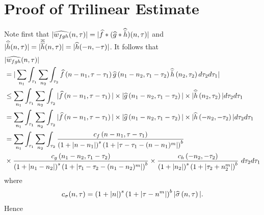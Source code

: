\section{Proof of Trilinear Estimate}
%
%
%
%
%
%
Note first that $|\widehat{w_{fgh}}(n, \tau) |  = | \widehat{f} * ( \widehat{g} 
* \widehat{\bar h})(n, \tau)|$ and $| \widehat{\bar{h}}(n, \tau) | = |\overline{ \widehat{\overline{h}} 
}(n, \tau)| = | \widehat{h}(-n, -\tau) |$. It follows that
%
%
\begin{equation}
	\label{nnon-lin-rep}
	\begin{split}
		& | \widehat{w_{fgh}}(n, \tau)|
    \\
    & = |  \sum_{n_{1} } \int_{\tau_{1}} \sum_{n_{2}}
    \int_{\tau_{2}} \widehat{f}\left( n
    -n_1,  \tau - \tau_1 \right) \widehat{g}\left( n_{1} - n_2, \tau_{1} - \tau_2  
\right) \widehat{\bar h}\left( n_2, \tau_2 \right) d \tau_2 d \tau_1 |
\\
& \le \sum_{n_{1} } \int_{\tau_{1}} \sum_{n_{2}}
\int_{\tau_{2}}  | \widehat{f}\left( n - n_1, \tau - \tau_1 
\right) | \times  | \widehat{g}\left( n_1 - n_2, \tau_1 - \tau_2 
\right) | \times | \widehat{\bar h}\left( n_{2}, \tau_{2} \right) | d \tau_2 d \tau_1
\\
& = \sum_{n_{1} } \int_{\tau_{1}} \sum_{n_{2}}
\int_{\tau_{2}}  | \widehat{f}\left( n - n_1, \tau - \tau_1 
     \right) | \times | \widehat{g}\left( n_{1} - n_2, \tau_{1} - \tau_2 
\right) | \times | \widehat{h}\left( -n_{2}, - \tau_2 \right) | d \tau_2 d \tau_1
\\
& = \sum_{n_{1} } \int_{\tau_{1}} \sum_{n_{2}}
\int_{\tau_{2}} \frac{c_f\left( n - n_1, \tau - \tau_1 
\right)}{\left (1 + |n - n_{1}| \right )^s \left( 1 + | \tau - \tau_1 - (n - n_{1})^{m} | \right)^{b}}
\\
& \times \frac{c_{g}\left( n_1 - n_2, \tau_1 - \tau_2 \right)}{\left (1 + |n_1 -
n_2| \right ) 
^s\left( 1 + | \tau_1 - \tau_2 -  (n_1 - n_2)^{m }| 
\right)^{b}}
 \times \frac{c_{h}\left( -n_{2}, -\tau_2 \right)}{\left (1 + |n_{2}| \right ) ^s\left( 1 + | 
\tau_2 + n_{2}^{m } | \right)^{b}} \ d \tau_2 d \tau_1
\end{split}
\end{equation}
%
%
where
%
%
\begin{equation*}
	\begin{split}
		c_\sigma(n, \tau) = \left (1 + |n| \right ) ^s \left( 1 + | \tau - n^{m } |  
		\right)^{b} | \widehat{\sigma}\left( n, \tau \right) | .
	\end{split}
\end{equation*}
%
%
Hence
%
%
